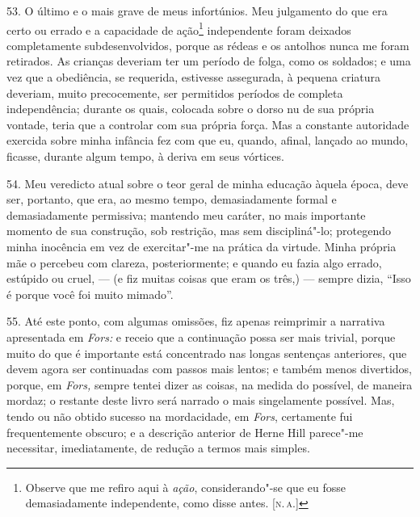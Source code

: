 53. O último e o mais grave de meus infortúnios. Meu julgamento do que
era certo ou errado e a capacidade de ação\footnote{Observe que me
  refiro aqui à \emph{ação}, considerando"-se que eu fosse demasiadamente
  independente, como disse antes. {[}\textsc{n.\,a.}{]}} independente foram
deixados completamente subdesenvolvidos, porque as rédeas e os antolhos
nunca me foram retirados. As crianças deveriam ter um período de folga,
como os soldados; e uma vez que a obediência, se requerida, estivesse
assegurada, à pequena criatura deveriam, muito precocemente, ser
permitidos períodos de completa independência; durante os quais,
colocada sobre o dorso nu de sua própria vontade, teria que a controlar
com sua própria força. Mas a constante autoridade exercida sobre minha
infância fez com que eu, quando, afinal, lançado ao mundo, ficasse,
durante algum tempo, à deriva em seus vórtices.

54. Meu veredicto atual sobre o teor geral de minha educação àquela
época, deve ser, portanto, que era, ao mesmo tempo, demasiadamente
formal e demasiadamente permissiva; mantendo meu caráter, no mais
importante momento de sua construção, sob restrição, mas sem
discipliná"-lo; protegendo minha inocência em vez de exercitar"-me na
prática da virtude. Minha própria mãe o percebeu com clareza,
posteriormente; e quando eu fazia algo errado, estúpido ou cruel, --- (e
fiz muitas coisas que eram os três,) --- sempre dizia, ``Isso é porque
você foi muito mimado''.

55. Até este ponto, com algumas omissões, fiz apenas reimprimir a
narrativa apresentada em \emph{Fors:} e receio que a continuação possa
ser mais trivial, porque muito do que é importante está concentrado nas
longas sentenças anteriores, que devem agora ser continuadas com passos
mais lentos; e também menos divertidos, porque, em \emph{Fors,} sempre
tentei dizer as coisas, na medida do possível, de maneira mordaz; o
restante deste livro será narrado o mais singelamente possível. Mas,
tendo ou não obtido sucesso na mordacidade, em \emph{Fors}, certamente
fui frequentemente obscuro; e a descrição anterior de Herne Hill
parece"-me necessitar, imediatamente, de redução a termos mais simples.

